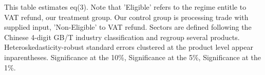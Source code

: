\documentclass[preview]{standalone}
\begin{document}
\begin{table}[!htbp]
\begin{tablenotes}
This table estimates eq(3). 
Note that 'Eligible' refers to the regime entitle to VAT refund, our treatment group.
Our control group is processing trade with supplied input, 'Non-Eligible' to VAT refund.
Sectors are defined following the Chinese 4-digit GB/T industry
classification and regroup several products.
Heteroskedasticity-robust standard errors
clustered at the product level appear inparentheses.
\sym{*} Significance at the 10\%, \sym{**} Significance at the 5\%, \sym{***} Significance at the 1\%. 
\end{tablenotes}
\end{table}
\end{document}
